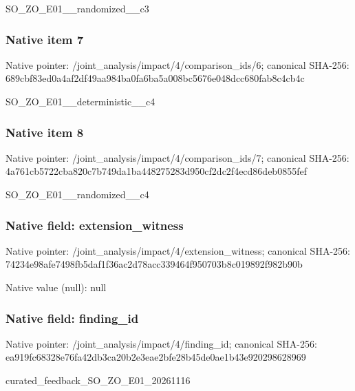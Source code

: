 \documentclass[10pt,a4paper]{article}
\begin{document}
\begingroup\raggedright\sloppy SO\_\allowbreak{}ZO\_\allowbreak{}E01\_\allowbreak{}\_\allowbreak{}randomized\_\allowbreak{}\_\allowbreak{}c3\par\endgroup

\subsubsection{Native item 7}
Native pointer: /joint\_\allowbreak{}analysis/impact/4/comparison\_\allowbreak{}ids/6; canonical SHA-256: 689cbf83ed0a4af2df49aa984ba0fa6ba5a008bc5676e048dcc680fab8c4cb4c

\begingroup\raggedright\sloppy SO\_\allowbreak{}ZO\_\allowbreak{}E01\_\allowbreak{}\_\allowbreak{}deterministic\_\allowbreak{}\_\allowbreak{}c4\par\endgroup

\subsubsection{Native item 8}
Native pointer: /joint\_\allowbreak{}analysis/impact/4/comparison\_\allowbreak{}ids/7; canonical SHA-256: 4a761cb5722cba820c7b749da1ba448275283d950cf2dc2f4ecd86deb0855fef

\begingroup\raggedright\sloppy SO\_\allowbreak{}ZO\_\allowbreak{}E01\_\allowbreak{}\_\allowbreak{}randomized\_\allowbreak{}\_\allowbreak{}c4\par\endgroup

\subsubsection{Native field: extension\_\allowbreak{}witness}
Native pointer: /joint\_\allowbreak{}analysis/impact/4/extension\_\allowbreak{}witness; canonical SHA-256: 74234e98afe7498fb5daf1f36ac2d78acc339464f950703b8c019892f982b90b

Native value (null): null

\subsubsection{Native field: finding\_\allowbreak{}id}
Native pointer: /joint\_\allowbreak{}analysis/impact/4/finding\_\allowbreak{}id; canonical SHA-256: ea919fc68328e76fa42db3ca20b2e3eae2bfe28b45de0ae1b43e920298628969

\begingroup\raggedright\sloppy curated\_\allowbreak{}feedback\_\allowbreak{}SO\_\allowbreak{}ZO\_\allowbreak{}E01\_\allowbreak{}20261116\par\endgroup
\end{document}
